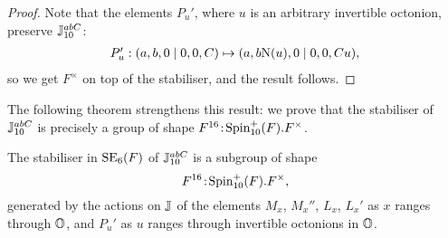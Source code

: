 \begin{proof}
	Note that the elements $P_u'$, where $u$ is an arbitrary
	invertible octonion, preserve $\mathbb{J}_{10}^{abC}$:
	\begin{equation*}
		\begin{array}{r@{\;}c@{\;}l}
			P_u': (a,b,0\mid 0,0,C) & \mapsto &
		(a,b \NN(u), 0 \mid 0,
			0, C u), 
		\end{array}
	\end{equation*}
	so we get $F^{\times}$ on top of the stabiliser, 
	and the result follows.
\end{proof}

The following theorem strengthens this result:
we prove that the stabiliser of $\mathbb{J}_{10}^{abC}$ is 
precisely a group of shape $F^{16}\mathord{{\;\!{:}\;\!}}\mathrm{Spin}_{10}^+(F).F^{\times}$.

\begin{theorem}
	\label{theorem:1_white_space_stab}
	The stabiliser in $\mathrm{SE}_6(F)$ of 
	$\mathbb{J}_{10}^{abC}$ is a subgroup of
	shape
	\begin{equation}
		F^{16}\mathord{{\;\!{:}\;\!}}\mathrm{Spin}_{10}^+(F).F^{\times},
	\end{equation}
	generated by the actions on $\mathbb{J}$ of the elements 
	$M_x$, $M_x''$, $L_x$, $L_x'$ as $x$ ranges through $\mathbb{O}$,
	and $P_u'$ as $u$ ranges through invertible octonions in 
	$\mathbb{O}$.
\end{theorem}


